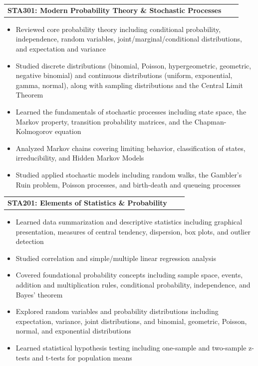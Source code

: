 \documentclass[a4paper,12pt]{article}
\makeatletter
\newenvironment{joblong}[2]
    {
    \begin{tabularx}{\linewidth}{@{}l X r@{}}
    \textbf{#1} & \hfill &  #2 \\[3.75pt]
    \end{tabularx}
    \begin{minipage}[t]{\linewidth}
    \begin{itemize}[nosep,after=\strut, leftmargin=1em, itemsep=3pt,label=--]
    }
    {
    \end{itemize}
    \end{minipage}    
    }
\makeatother
\begin{document}
\begin{joblong}{STA301: Modern Probability Theory \& Stochastic Processes}{}
	\item Reviewed core probability theory including conditional probability, independence, random variables, joint/marginal/conditional distributions, and expectation and variance
	\item Studied discrete distributions (binomial, Poisson, hypergeometric, geometric, negative binomial) and continuous distributions (uniform, exponential, gamma, normal), along with sampling distributions and the Central Limit Theorem
	\item Learned the fundamentals of stochastic processes including state space, the Markov property, transition probability matrices, and the Chapman-Kolmogorov equation
	\item Analyzed Markov chains covering limiting behavior, classification of states, irreducibility, and Hidden Markov Models
	\item Studied applied stochastic models including random walks, the Gambler's Ruin problem, Poisson processes, and birth-death and queueing processes
\end{joblong}

\begin{joblong}{STA201: Elements of Statistics \& Probability}{}
	\item Learned data summarization and descriptive statistics including graphical presentation, measures of central tendency, dispersion, box plots, and outlier detection
	\item Studied correlation and simple/multiple linear regression analysis
	\item Covered foundational probability concepts including sample space, events, addition and multiplication rules, conditional probability, independence, and Bayes' theorem
	\item Explored random variables and probability distributions including expectation, variance, joint distributions, and binomial, geometric, Poisson, normal, and exponential distributions
	\item Learned statistical hypothesis testing including one-sample and two-sample z-tests and t-tests for population means
\end{joblong}
\end{document}
